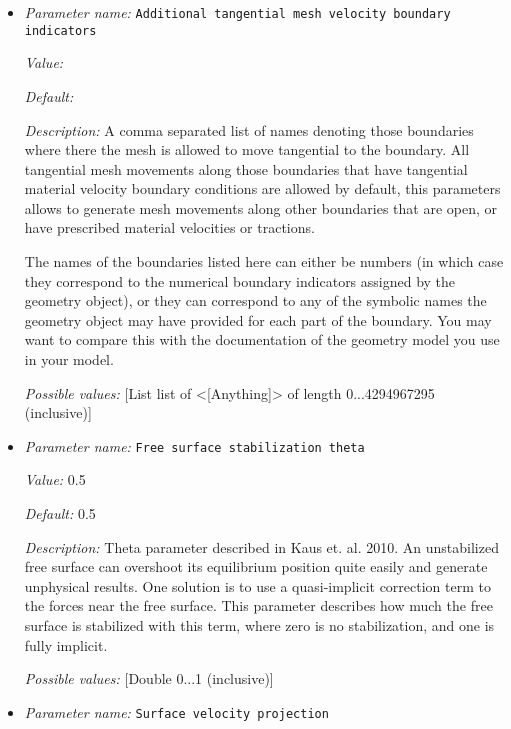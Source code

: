 \begin{itemize}
\item {\it Parameter name:} {\tt Additional tangential mesh velocity boundary indicators}
\label{parameters:Free surface/Additional tangential mesh velocity boundary indicators}


{\it Value:} 


{\it Default:} 


{\it Description:} A comma separated list of names denoting those boundaries where there the mesh is allowed to move tangential to the boundary. All tangential mesh movements along those boundaries that have tangential material velocity boundary conditions are allowed by default, this parameters allows to generate mesh movements along other boundaries that are open, or have prescribed material velocities or tractions.

The names of the boundaries listed here can either be numbers (in which case they correspond to the numerical boundary indicators assigned by the geometry object), or they can correspond to any of the symbolic names the geometry object may have provided for each part of the boundary. You may want to compare this with the documentation of the geometry model you use in your model.


{\it Possible values:} [List list of <[Anything]> of length 0...4294967295 (inclusive)]
\item {\it Parameter name:} {\tt Free surface stabilization theta}
\label{parameters:Free surface/Free surface stabilization theta}


{\it Value:} 0.5


{\it Default:} 0.5


{\it Description:} Theta parameter described in Kaus et. al. 2010. An unstabilized free surface can overshoot its equilibrium position quite easily and generate unphysical results.  One solution is to use a quasi-implicit correction term to the forces near the free surface.  This parameter describes how much the free surface is stabilized with this term, where zero is no stabilization, and one is fully implicit.


{\it Possible values:} [Double 0...1 (inclusive)]
\item {\it Parameter name:} {\tt Surface velocity projection}
\label{parameters:Free surface/Surface velocity projection}



\end{itemize}
